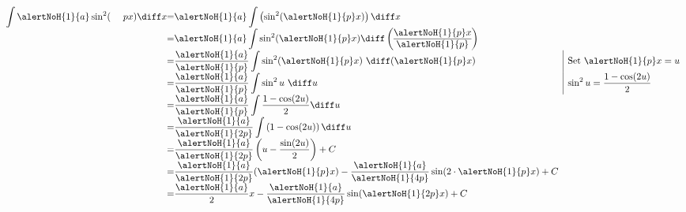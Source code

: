 \begin{frame}
\vskip -0.2cm
\begin{example}
\hfil \hfil $
\begin{array}{@{}r@{}c@{}l@{}l|l}
\displaystyle \int \alertNoH{1}{a} \sin^2(~~~~px)\diff x &=&\displaystyle \alertNoH{1}{a} \int \left( \sin^2 (\alertNoH{1}{p}x)\right)\diff x \\
&=& \displaystyle \alertNoH{1}{a}\int \sin^2(\alertNoH{1}{p}x)    \diff  \left(
\begin{array}{@{}c@{}}
\alertNoH{1}{p} x
\\\hline \alertNoH{1}{p}
\end{array}
\right)  \\
&=& \displaystyle \frac{\alertNoH{1}{a} }{\alertNoH{1}{p}}\int \sin^2 (\alertNoH{1}{p}x)~ \diff (\alertNoH{1}{p}x) &&\text{Set }\alertNoH{1}{p}x=u\\
&=& \displaystyle \frac{\alertNoH{1}{a}}{\alertNoH{1}{p}} \int  \sin^2 u ~ \diff  u &&\displaystyle  \sin^2 u =\frac{1-\cos(2u)}{2} \\
&=&\displaystyle \frac{\alertNoH{1}{a}}{\alertNoH{1}{p}} \int \frac{1-\cos(2u)}{2} \diff u \\
&=&\displaystyle \frac{\alertNoH{1}{a}}{\alertNoH{1}{2p}} \int \left( 1- \cos (2u) \right)\diff u\\
&=&\displaystyle \frac{\alertNoH{1}{a}}{\alertNoH{1}{2p}}\left(  u -  \frac{\sin(2u )}{2} \right)+C\\
&=&\displaystyle \frac{\alertNoH{1}{a}}{ \alertNoH{1}{2p}} (\alertNoH{1}{p}x)- \frac{\alertNoH{1}{a}}{\alertNoH{1}{4p}} \sin( 2\cdot \alertNoH{1}{p}x)+C\\
&=&\displaystyle \frac{\alertNoH{1}{a}}{2}x-\frac{\alertNoH{1}{a}}{\alertNoH{1}{4p}} \sin(\alertNoH{1}{2p}x)+C
\end{array}
$
\vskip -0.2cm
\end{example}
\end{frame}